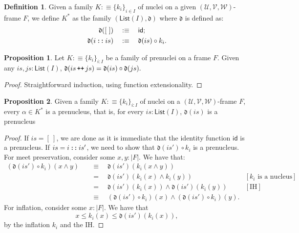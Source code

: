 \documentclass[a4paper, 11pt]{article}
\theoremstyle{definition}
\newtheorem{prop}{Proposition}
\newtheorem{defn}{Definition}
\DeclareMathOperator{\cons}{\text{\texttt{::}}}
\DeclareMathOperator{\append}{\text{\texttt{++}}}
\newcommand{\UU}{\mathcal{U}}
\newcommand{\VV}{\mathcal{V}}
\newcommand{\WW}{\mathcal{W}}
\newcommand{\define}[1]{\emph{#1}}
\begin{document}
\begin{defn}
  Given a family $K :\equiv \{ k_i \}_{i \in I}$ of nuclei on a given $(\UU, \VV, \WW)$-frame $F$, we
  define \define{$K^*$} as the family $(\mathsf{List}(I), \mathfrak{d})$ where $\mathfrak{d}$ is
  defined as:
  \begin{align*}
    \mathfrak{d}(\mathtt{[\ ]})  \quad&:\equiv\quad \mathsf{id}; \\
    \mathfrak{d}(i \cons is)     \quad&:\equiv\quad \mathfrak{d}(is) \circ k_i.
  \end{align*}
\end{defn}

\begin{prop}\label{prop:app-lemma}
  Let $K :\equiv \{ k_i \}_{i : I}$ be a family of prenuclei on a frame $F$. Given
  any $is, js : \mathsf{List}(I)$,
  \(
    \mathfrak{d}(is \append js) = \mathfrak{d}(is) \circ \mathfrak{d}(js).
  \)
\end{prop}
\begin{proof}
  Straightforward induction, using function extensionality.
\end{proof}

\begin{prop}\label{prop:star-prenucleus}
  Given a family $K :\equiv \{ k_i \}_{i : I}$ of nuclei on a $(\UU, \VV, \WW)$-frame
  $F$, every $\alpha \in K^*$ is a prenucleus, that is, for every
  $is : \mathsf{List}(I)$, $\mathfrak{d}(is)$ is a prenucleus
\end{prop}
\begin{proof}
  If $is = \mathtt{[\ ]}$, we are done as it is immediate that the identity
  function $\mathsf{id}$ is a prenucleus. If $is = i \cons is'$, we need
  to show that $\mathfrak{d}(is') \circ k_i$ is a prenucleus. For meet preservation,
  consider some $x, y : | F |$. We have that:
  \begin{align*}
    (\mathfrak{d}(is') \circ k_i)(x \wedge y)
      &\quad\equiv\quad \mathfrak{d}(is')(k_i(x \wedge y))\\
      &\quad=\quad \mathfrak{d}(is')(k_i(x) \wedge k_i(y)) & [\text{$k_i$ is a nucleus}]\\
      &\quad=\quad \mathfrak{d}(is')(k_i(x)) \wedge \mathfrak{d}(is')(k_i(y)) & [\text{IH}]\\
      &\quad\equiv\quad (\mathfrak{d}(is') \circ k_i)(x) \wedge (\mathfrak{d}(is') \circ k_i)(y).
  \end{align*}
  For inflation, consider some $x : | F |$. We have that
  \begin{equation*}
    x \le k_i(x) \le \mathfrak{d}(is')(k_i(x)),
  \end{equation*}
  by the inflation $k_i$ and the IH.
\end{proof}
\end{document}
